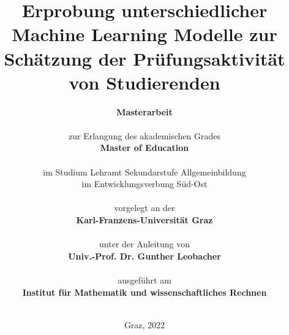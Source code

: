 \documentclass[
    fontsize=12pt,
    paper=A4,
    parskip=full, %
    bibliography=totoc,
    abstract=on,
    listof=totoc,
]{scrreprt} %
\title{
        {Erprobung unterschiedlicher Machine Learning Modelle zur Sch\"atzung der Pr\"ufungsaktivit\"at von Studierenden}
        }
\author{
        
        \Huge{\textbf{Masterarbeit}} \\
        \ \\
        \large{zur Erlangung des akademischen Grades} \\
        \large{\textbf{Master of Education}}\\ 
        \\
        \large{im Studium Lehramt Sekundarstufe Allgemeinbildung}\\
        \large{im Entwicklungsverbung Süd-Ost}\\
        \ \\
        \large{vorgelegt an der} \\
        \large{\textbf{Karl-Franzens-Universität Graz}}\\
        \\
        \large{unter der Anleitung von} \\
        \large{\textbf{Univ.-Prof. Dr. Gunther Leobacher}} \\
        \\
        \large{ausgef\"uhrt am}\\
        \large{\textbf{Institut f\"ur Mathematik und wissenschaftliches Rechnen}}
        \\
        \\
        }
\date{ \normalsize{Graz, 2022}}
\begin{document}
\begin{singlespace}
    \maketitle 
    \setcounter{page}{2}
\end{singlespace}









    \tableofcontents %
    \listoffigures %
    \listoftables %
\end{document}
